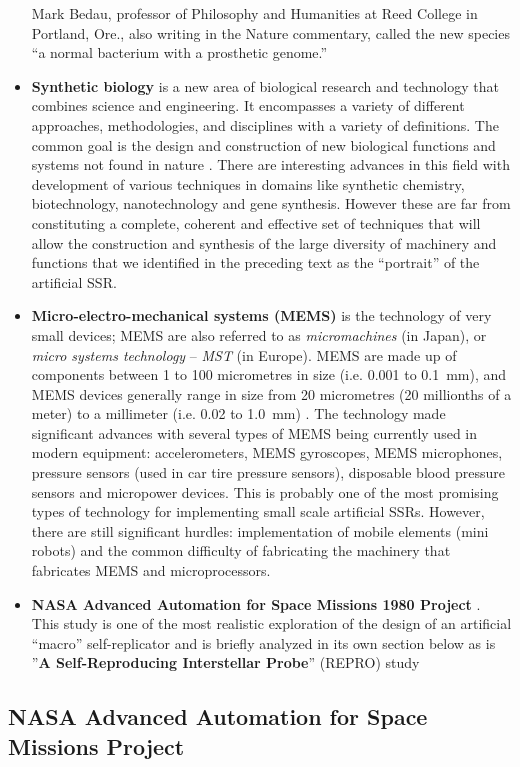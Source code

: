 \begin{itemize}
Mark Bedau, professor of Philosophy and
Humanities at Reed College in Portland, Ore., also writing in the
Nature commentary, called the new species ``a normal
bacterium with a prosthetic genome.'' 
\item \textbf{Synthetic
biology} is a new area of biological
research and technology that combines science and engineering. It
encompasses a variety of different approaches, methodologies, and
disciplines with a variety of definitions. The common goal is the
design and construction of new biological functions and systems not
found in nature . There are interesting advances in this field with
development of various techniques in domains like synthetic chemistry,
biotechnology, nanotechnology and gene synthesis. However these are far
from constituting a complete, coherent and effective set of techniques
that will allow the construction and synthesis of the large diversity
of machinery and functions that we identified in the preceding text as
the “portrait” of the artificial SSR.
\item \textbf{Micro-electro-mechanical systems (MEMS)} is the technology
of very small devices; MEMS are also referred to as
\textit{micromachines} (in Japan), or \textit{micro systems technology}
– \textit{MST} (in Europe). MEMS are made up of components between 1 to
100 micrometres in size (i.e. 0.001 to 0.1~mm), and MEMS devices
generally range in size from 20 micrometres (20 millionths of a meter)
to a millimeter (i.e. 0.02 to 1.0~mm) . The technology made significant
advances with several types of MEMS being currently used in modern
equipment:  accelerometers, MEMS gyroscopes, MEMS microphones, pressure
sensors (used in car tire pressure sensors), disposable blood pressure
sensors and micropower devices. This is probably one of the most
promising types of technology for implementing small scale artificial
SSRs. However, there are still significant hurdles: implementation of
mobile elements (mini robots) and the common difficulty of fabricating
the machinery that fabricates MEMS and microprocessors.
\item \textbf{NASA Advanced Automation for Space Missions 1980 Project}
. This study is one of the most realistic exploration of the design of
an artificial “macro” self-replicator and is briefly analyzed in its
own section below as is ”\textbf{A Self-Reproducing Interstellar
Probe}” (REPRO) study 
\end{itemize}

\subsection[NASA Advanced Automation for Space Missions Project]{NASA
Advanced Automation for Space Missions Project}

